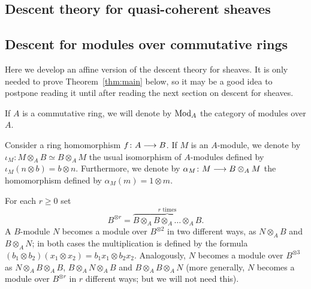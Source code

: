 \begin{4   STACKS}
\begin{4.1 Descent of objects of fibcats}





\end{4.1 Descent of objects of fibcats}
\begin{4.2 Descent for quasi-coherent sheaves}
\setcounter{section}{1}
\section{Descent theory for quasi-coherent sheaves}



\subsection{Descent for modules over commutative rings}
\label{subsec:descent-rings}

Here we develop an affine version of the descent theory for \qc sheaves.  It is only needed to prove Theorem~\ref{thm:main} below, so it may be a good idea to postpone reading it until after reading the next section on descent for \qc sheaves.

If $A$ is a commutative ring, we will denote by $\mathrm{Mod}_{A}$ the category of modules over $A$. 

Consider a ring homomorphism $f \colon A \arr B$. If $M$ is an $A$-module, we denote by $\iota_M \colon M \otimes_A B \simeq B \otimes_A M$ the usual isomorphism of $A$-modules defined by $\iota_M(n \otimes b) = b \otimes n$. Furthermore, we denote by $\alpha_M \colon M \arr B \otimes_{A} M$ the homomorphism defined by $\alpha_M(m) = 1 \otimes m$.

For each $r \ge 0$ set
   \[
   B^{\otimes r} = \overbrace{B \otimes_A B
   \otimes_A \dots \otimes _A B}^{\text{$r$ times}}.
   \]
A $B$-module $N$ becomes a module over $B^{\otimes 2}$ in two different ways, as $N \otimes_A B$ and $B \otimes_A N$; in both cases the multiplication is defined by the formula $(b_1 \otimes b_2)(x_1 \otimes x_2) = b_1x_1 \otimes b_2x_2$. Analogously, $N$ becomes a module over $B^{ \otimes 3}$ as $N \otimes_A B \otimes_A B$, $B \otimes_A N \otimes_A B$ and $B \otimes_A B \otimes_A N$ (more generally, $N$ becomes a module over $B^{\otimes r}$ in $r$ different ways; but we will not need this).


\end{4.2 Descent for quasi-coherent sheaves}
\end{4   STACKS}
